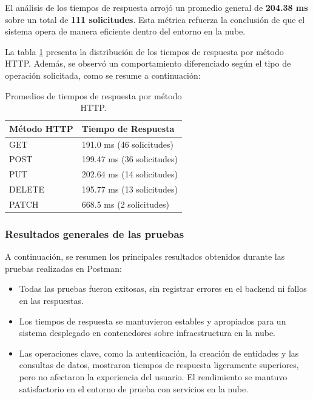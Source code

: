 El análisis de los tiempos de respuesta arrojó un promedio general de
\textbf{204.38 ms} sobre un total de \textbf{111 solicitudes}. Esta métrica
refuerza la conclusión de que el sistema opera de manera eficiente dentro del
entorno en la nube.

La tabla \ref{tab:promedios_metodo_http} presenta la distribución de los
tiempos de respuesta por método HTTP. Además, se observó un comportamiento
diferenciado según el tipo de operación solicitada, como se resume a
continuación:

\begin{table}[H]
    \centering
    \caption[Promedios de tiempos de respuesta]{Promedios de tiempos de respuesta por método HTTP.}
    \begin{tabular}{ l l }
        \toprule
        \textbf{Método HTTP} & \textbf{Tiempo de Respuesta} \\
        \midrule
        GET                  & 191.0 ms (46 solicitudes)    \\
        POST                 & 199.47 ms (36 solicitudes)   \\
        PUT                  & 202.64 ms (14 solicitudes)   \\
        DELETE               & 195.77 ms (13 solicitudes)   \\
        PATCH                & 668.5 ms (2 solicitudes)     \\
        \bottomrule
    \end{tabular}
    \label{tab:promedios_metodo_http}
\end{table}

\subsubsection{Resultados generales de las pruebas}

A continuación, se resumen los principales resultados obtenidos durante las
pruebas realizadas en Postman:

\begin{itemize}
    \item Todas las pruebas fueron exitosas, sin registrar errores en el backend ni
          fallos en las respuestas.
    \item Los tiempos de respuesta se mantuvieron estables y apropiados para un sistema
          desplegado en contenedores sobre infraestructura en la nube.
    \item Las operaciones clave, como la autenticación, la creación de entidades y las
          consultas de datos, mostraron tiempos de respuesta ligeramente superiores, pero
          no afectaron la experiencia del usuario. El rendimiento se mantuvo
          satisfactorio en el entorno de prueba con servicios en la nube.
\end{itemize}


